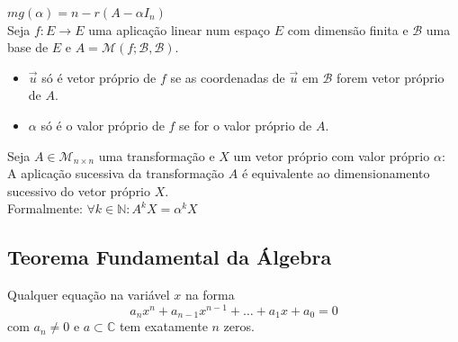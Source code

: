 \documentclass[]{report}
\begin{document}
$mg(\alpha) = n - r(A - \alpha I_n)$\\[2mm]
Seja $f: E \to E$ uma aplicação linear num espaço $E$ com dimensão finita e $\mathcal{B}$ uma base de $E$ e $A=\mathcal{M}(f; \mathcal{B},\mathcal{B})$.
\begin{itemize}
\item $\vec u$ só é vetor próprio de $f$ se as coordenadas de $\vec u$ em $\mathcal{B}$ forem vetor próprio de $A$.
\item $\alpha$ só é o valor próprio de $f$ se for o valor próprio de $A$.
\end{itemize}
Seja $A \in \mathcal{M}_{n \times n}$ uma transformação e $X$ um vetor próprio com valor próprio $\alpha$:\\
A aplicação sucessiva da transformação $A$ é equivalente ao dimensionamento sucessivo do vetor próprio $X$.\\
Formalmente: $\forall k \in \mathbb{N} : A^k X = \alpha^k X$
\subsection{Teorema Fundamental da Álgebra}
Qualquer equação na variável $x$ na forma
$$a_n x^n + a_{n-1} x^{n-1} + \dots + a_1 x + a_0 = 0$$
com $a_n \neq 0$ e $a \subset \mathbb{C}$ tem exatamente $n$ zeros.
\end{document}
